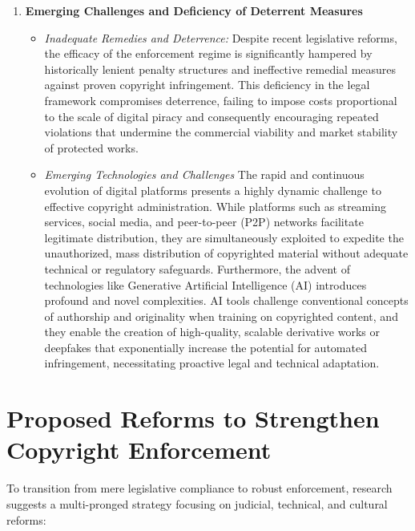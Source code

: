 \documentclass[10pt,letterpaper]{article}
\begin{document}
\begin{enumerate}
   \item \textbf{Emerging Challenges and Deficiency of Deterrent Measures}
   \begin{itemize}
      \item \textit{Inadequate Remedies and Deterrence:}
      Despite recent legislative reforms, the efficacy of the enforcement regime is significantly hampered by historically lenient penalty structures and ineffective remedial measures against proven copyright infringement. This deficiency in the legal framework compromises deterrence, failing to impose costs proportional to the scale of digital piracy and consequently encouraging repeated violations that undermine the commercial viability and market stability of protected works.

      \item \textit{Emerging Technologies and Challenges}
      The rapid and continuous evolution of digital platforms presents a highly dynamic challenge to effective copyright administration. While platforms such as streaming services, social media, and peer-to-peer (P2P) networks facilitate legitimate distribution, they are simultaneously exploited to expedite the unauthorized, mass distribution of copyrighted material without adequate technical or regulatory safeguards. Furthermore, the advent of technologies like Generative Artificial Intelligence (AI) introduces profound and novel complexities. AI tools challenge conventional concepts of authorship and originality when training on copyrighted content, and they enable the creation of high-quality, scalable derivative works or deepfakes that exponentially increase the potential for automated infringement, necessitating proactive legal and technical adaptation.
   \end{itemize}
\end{enumerate}


\section{Proposed Reforms to Strengthen Copyright Enforcement}
To transition from mere legislative compliance to robust enforcement, research suggests a multi-pronged strategy focusing on judicial, technical, and cultural reforms:
\end{document}
